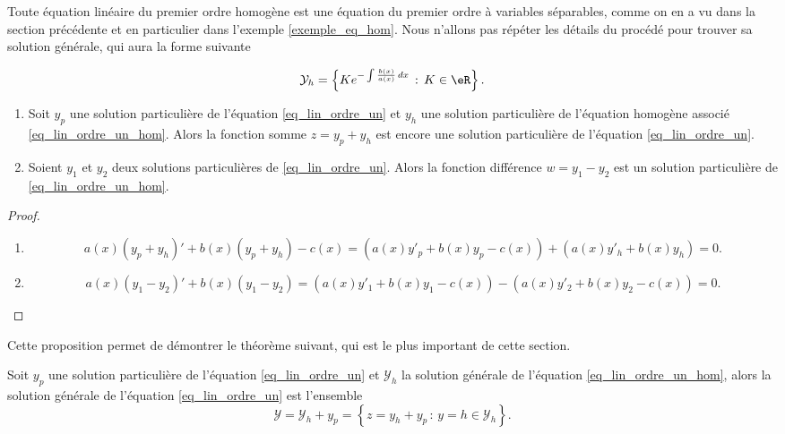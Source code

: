 Toute équation linéaire du premier ordre homogène est une équation du premier ordre à variables séparables, comme on en a vu dans la section précédente et en particulier dans l'exemple \ref{exemple_eq_hom}. Nous n'allons pas répéter les détails du procédé pour trouver sa solution générale, qui aura la forme suivante 
\begin{Aretenir}
  \begin{equation}\label{solgeneqlinordre1}
    \mathcal{Y}_h=\left\{Ke^{-\int\frac{b(x)}{a(x)}\, dx}\,:\, K\in\eR\right\}.
  \end{equation}
\end{Aretenir}
\begin{proposition}
  \begin{enumerate}
  \item Soit $y_p$ une solution particulière de l'équation \eqref{eq_lin_ordre_un} et $y_h$ une solution particulière de l'équation homogène associé \eqref{eq_lin_ordre_un_hom}. Alors la fonction somme $z= y_p+y_h$ est encore une solution particulière de l'équation \eqref{eq_lin_ordre_un}.
  \item Soient $y_1$ et $y_2$ deux solutions particulières de \eqref{eq_lin_ordre_un}. Alors la fonction différence $w = y_1-y_2$ est un solution particulière de \eqref{eq_lin_ordre_un_hom}.
  \end{enumerate}
\end{proposition}
\begin{proof}
  \begin{enumerate}
  \item 
    \begin{equation}
      a(x)\left(y_p+y_h\right)' + b(x)\left(y_p+y_h\right)-c(x)  =\left( a(x)y'_p+ b(x)y_p-c(x)\right) + \left( a(x)y'_h+ b(x)y_h\right) = 0.
    \end{equation}
  \item 
    \begin{equation}
      a(x)\left(y_1-y_2\right)' + b(x)\left(y_1-y_2\right) =\left( a(x)y'_1+ b(x)y_1-c(x)\right) -\left( a(x)y'_2+ b(x)y_2-c(x)\right) = 0.
    \end{equation}
  \end{enumerate}
\end{proof}
Cette proposition permet de démontrer le théorème suivant, qui est le plus important de cette section.
\begin{theorem}
  Soit $y_p$ une solution particulière de l'équation \eqref{eq_lin_ordre_un} et $\mathcal{Y}_h$ la solution générale de l'équation \eqref{eq_lin_ordre_un_hom}, alors la solution générale de l'équation \eqref{eq_lin_ordre_un} est l'ensemble 
  \begin{equation}
    \mathcal{Y} = \mathcal{Y}_h +y_p = \left\{z= y_h + y_p\,:\, y=h \in\mathcal{Y}_h \right\}.
  \end{equation}
\end{theorem}
